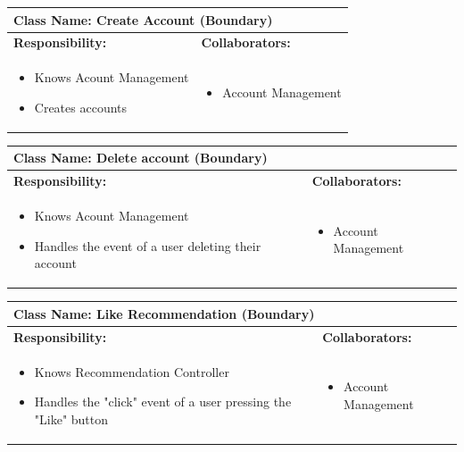 \documentclass[]{article}
\begin{document}
\begin{table}[H]
	\centering
	\begin{tabular}{|p{7cm}|p{7cm}|}
	\hline 
	 \multicolumn{2}{|l|}{\textbf{Class Name:} Create Account (Boundary)} \\
	\hline
	\textbf{Responsibility:} & \textbf{Collaborators:} \\
	\hline
	\raggedright
	\begin{itemize}
		\item Knows Acount Management
		\item Creates accounts
	\end{itemize}
	\vspace{1in} & 
	\begin{itemize}
		\item Account Management
	\end{itemize} \\
	\hline
	\end{tabular}
\end{table}

\begin{table}[H]
	\centering
	\begin{tabular}{|p{7cm}|p{7cm}|}
	\hline 
	 \multicolumn{2}{|l|}{\textbf{Class Name:} Delete account (Boundary)} \\
	\hline
	\textbf{Responsibility:} & \textbf{Collaborators:} \\
	\hline
	\raggedright
	\begin{itemize}
		\item Knows Acount Management
		\item Handles the event of a user deleting their account
	\end{itemize}
	\vspace{1in} & 
	\begin{itemize}
		\item Account Management
	\end{itemize} \\
	\hline
	\end{tabular}
\end{table}

\begin{table}[H]
	\centering
	\begin{tabular}{|p{7cm}|p{7cm}|}
	\hline 
	 \multicolumn{2}{|l|}{\textbf{Class Name:} Like Recommendation (Boundary)} \\
	\hline
	\textbf{Responsibility:} & \textbf{Collaborators:} \\
	\hline
	\raggedright
	\begin{itemize}
		\item Knows Recommendation Controller
		\item Handles the "click" event of a user pressing the "Like" button
	\end{itemize}
	\vspace{1in} & 
	\begin{itemize}
		\item Account Management
	\end{itemize} \\
	\hline
	\end{tabular}
\end{table}
\end{document}
